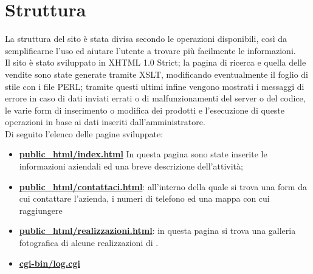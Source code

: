 \section{Struttura}{
	La struttura del sito è stata divisa secondo le operazioni disponibili, così da semplificarne l'uso ed aiutare l'utente a trovare più facilmente le informazioni.
	\\
	Il sito è stato sviluppato in XHTML 1.0 Strict; la pagina di ricerca e quella delle vendite sono state generate tramite XSLT, modificando eventualmente il foglio di stile con i file PERL; tramite questi ultimi infine vengono mostrati i messaggi di errore in caso di dati inviati errati o di malfunzionamenti del server o del codice, le varie form di inserimento o modifica dei prodotti e l'esecuzione di queste operazioni in base ai dati inseriti dall'amministratore.
	\\
	Di seguito l'elenco delle pagine sviluppate:
	\begin{itemize}
		\item \textbf{\url{ public_html/index.html}} In questa pagina sono state inserite le informazioni aziendali ed una breve descrizione dell'attività; 
		\item \textbf{\url{public_html/contattaci.html}}: all'interno della quale si trova una form da cui contattare l'azienda, i numeri di telefono ed una mappa con cui raggiungere \textbf{\ggt} 
		\item \textbf{\url{public_html/realizzazioni.html}}: in questa pagina si trova una galleria fotografica di alcune realizzazioni di \textbf{\ggt}.
		\item \textbf{\url{cgi-bin/log.cgi}} 
	\end{itemize}
}
